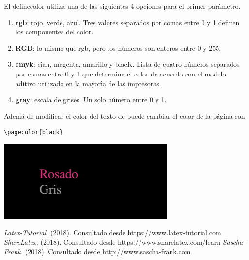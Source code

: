 \documentclass[letterpaper, 10pt, journal]{IEEEtran}
\begin{document}
El definecolor utiliza una de las siguientes 4 opciones para el primer par\'{a}metro.

\begin{enumerate}
\item \textbf{rgb}: rojo, verde, azul. Tres valores separados por comas entre 0 y 1 definen los componentes del color.
\item \textbf{RGB}: lo mismo que rgb, pero los n\'{u}meros son enteros entre 0 y 255.
\item \textbf{cmyk}: cian, magenta, amarillo y blacK. Lista de cuatro n\'{u}meros separados por comas entre 0 y 1 que determina el color de acuerdo con el modelo aditivo utilizado en la mayor\'{\i}a de las impresoras.
\item \textbf{gray}: escala de grises. Un solo n\'{u}mero entre 0 y 1.
\end{enumerate}

Adem\'{a} de modificar el color del texto de puede cambiar el color de la p\'{a}gina con

\begin{lstlisting}
\pagecolor{black}
\end{lstlisting}

\includegraphics[scale=1]{ejemplofondo}

\begin{thebibliography}{1}
 \emph{Latex-Tutorial.} (2018). Consultado desde https://www.latex-tutorial.com
 \emph{ShareLatex.} (2018). Consultado desde https://www.sharelatex.com/learn
 \emph{Sascha-Frank.} (2018). Consultado desde http://www.sascha-frank.com


\end{thebibliography}
\end{document}
